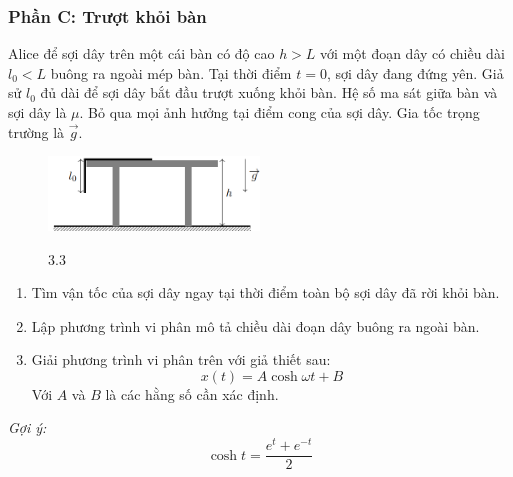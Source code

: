 \subsubsection*{Phần C: Trượt khỏi bàn}
\noindent Alice để sợi dây trên một cái bàn có độ cao $h > L$ với một đoạn dây có chiều dài $l_0 < L$ buông ra ngoài mép bàn. Tại thời điểm $t = 0$, sợi dây đang đứng yên. Giả sử $l_0$ đủ dài để sợi dây bắt đầu trượt xuống khỏi bàn. Hệ số ma sát giữa bàn và sợi dây là $\mu$. Bỏ qua mọi ảnh hưởng tại điểm cong của sợi dây. Gia tốc trọng trường là $\vec{g}$.
\begin{figure}[H]
  \centering
  \includegraphics[width=0.5\textwidth]{Figures/Problems/Fig 3.3.png}
  \begin{center}
    \figurename{ 3.3}
  \end{center}
\end{figure}
\vspace{-0.5cm}

\begin{enumerate}
  \item Tìm vận tốc của sợi dây ngay tại thời điểm toàn bộ sợi dây đã rời khỏi bàn.
  \item Lập phương trình vi phân mô tả chiều dài đoạn dây buông ra ngoài bàn.
  \item Giải phương trình vi phân trên với giả thiết sau:
        \begin{equation*}
          x(t) = A \cosh \omega t + B
        \end{equation*}
        Với $A$ và $B$ là các hằng số cần xác định.
\end{enumerate}
\noindent\textit{Gợi ý:}
\begin{equation*}
  \cosh t = \frac{e^t + e^{-t}}{2}
\end{equation*}

